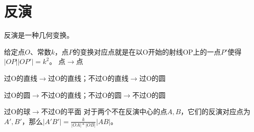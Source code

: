 \section{反演}

\begin{frame}
\pause
反演是一种几何变换。

给定点$O$、常数$k$，点$P$的变换对应点就是在以O开始的射线OP上的一点$P'$使得$|OP||OP'|=k^2$。 \newline \newline
\pause
点$\rightarrow$点

过O的直线$\rightarrow$过O的直线；不过O的直线$\rightarrow$过O的圆

过O的圆$\rightarrow$不过O的直线；不过O的圆$\rightarrow$不过O的圆

过O的球$\rightarrow$不过O的平面 \newline \newline
\pause
对于两个不在反演中心的点$A,B$，它们的反演对应点为$A',B'$，那么$|A'B'|=\frac{k}{|OA|*|OB|}|AB|$。

\end{frame}